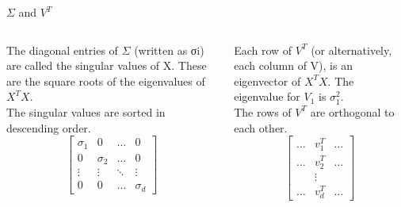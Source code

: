 \documentclass[aspectratio=169]{../latex_main/tntbeamer}  %
\begin{document}
	\begin{frame}{$\Sigma$ and $V^T$}
	    \begin{columns}
	        \begin{column}{.5\textwidth}
	               The diagonal entries of $\Sigma$ (written as σi) are called the singular values of X. These are the square roots of the eigenvalues of $X^TX$.\\
	               The singular values are sorted in descending order.
	               \begin{equation*}
	               \left[\begin{array}{cccc}
	                        \sigma_1 & 0 & \dots & 0 \\
	                        0 & \sigma_2 & \dots & 0 \\
	                        \vdots &     \vdots   &   \ddots  &  \vdots  \\
                            0 & 0 & \dots &\sigma_d
	                \end{array}\right]
	                \end{equation*}
	        \end{column}
	        
	        \begin{column}{.5\textwidth}
	               Each row of $V^T$ (or alternatively, each column of V), is an eigenvector of $X^TX$. The eigenvalue for $V_1$ is $\sigma_1^2$.\\
	               The rows of $V^T$ are orthogonal to each other.
                   \begin{equation*}
	               \left[\begin{array}{ccc}
	                    \dots & v^T_1 & \dots  \\
	                    \dots & v^T_2 & \dots  \\
	                      &     \vdots   &  \\
	                    \dots & v^T_d & \dots  
	                \end{array}\right]
	                \end{equation*}
	        \end{column}
	    \end{columns}
	\end{frame}
\end{document}
